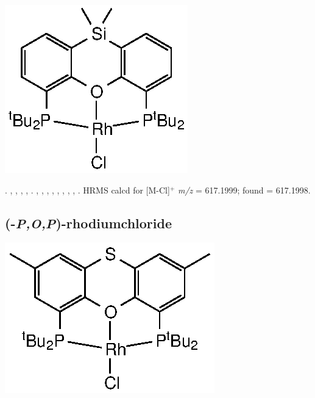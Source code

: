 \begin{structure}[h]
\begin{center}
\includegraphics{../Structures/SitBuRhCl.eps}
\end{center}
\end{structure}

.
,
,
,
,
.
,
,
,
,
,
,
,
,
.
HRMS calcd for  [M-Cl]$^+$ \emph{m/z} = 617.1999; found = 617.1998.



\subsection*{(\tBuThixantphosk-\emph{P,O,P})-rhodiumchloride}

\begin{structure}[h]
\begin{center}
\includegraphics{../Structures/RhCl(StBu).eps}
\end{center}
\end{structure}

